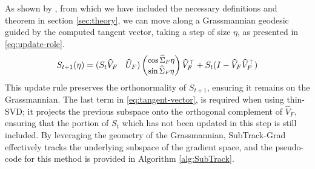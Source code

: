As shown by \citet{edelman1998geometryalgorithmsorthogonalityconstraints, Bendokat_2024}, from which we have included the necessary definitions and theorem in section \ref{sec:theory}, we can move along a Grassmannian geodesic guided by the computed tangent vector, taking a step of size \(\eta\), as presented in \eqref{eq:update-role}.
\begin{equation}\label{eq:update-role}
\small
S_{t+1}(\eta) = (S_t\widehat{V}_F \quad \widehat{U}_F) \begin{pmatrix} \cos{\widehat{\Sigma}_F \eta} \\ \sin{\widehat{\Sigma}_F \eta} \end{pmatrix} \widehat{V}^\top_F + S_t(I - \widehat{V}_F\widehat{V}^\top_F)
\end{equation}
This update rule preserves the orthonormality of \(S_{t+1}\), ensuring it remains on the Grassmannian. The last term in \eqref{eq:tangent-vector}, is required when using thin-SVD; it projects the previous subspace onto the orthogonal complement of \(\widehat{V}_F\), ensuring that the portion of \(S_t\) which has not been updated in this step is still included. By leveraging the geometry of the Grassmannian, SubTrack-Grad effectively tracks the underlying subspace of the gradient space, and the pseudo-code for this method is provided in Algorithm \ref{alg:SubTrack}.
